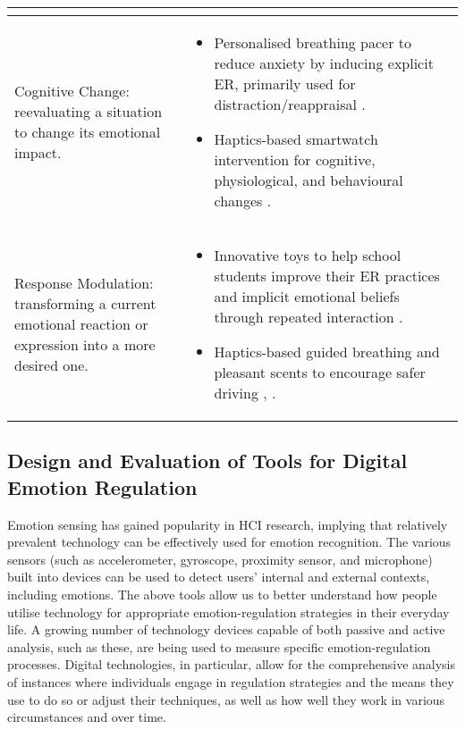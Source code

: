 \begin{table}[]
\begin{tabular}{m{6cm}m{10cm}}
\begin{itemize}
\end{itemize}                                       \\ \hline
Cognitive Change: reevaluating a situation to change its emotional impact.                                                               & \begin{itemize}
\item Personalised breathing pacer to reduce anxiety by inducing explicit ER, primarily used for distraction/reappraisal \cite{miri2020evaluating}.
\item Haptics-based smartwatch intervention for cognitive, physiological, and behavioural changes \cite{costa2019boostmeup}.
\end{itemize}                        \\ \hline
Response Modulation: transforming a current emotional reaction or expression into a more desired one.                                    & \begin{itemize}
\item Innovative toys to help school students improve their ER practices and implicit emotional beliefs through repeated interaction \cite{theofanopoulou2019smart}.
\item Haptics-based guided breathing and pleasant scents to encourage safer driving \cite{paredes2018just}, \cite{dmitrenko2020caroma}.
\end{itemize}                      \\ \hline
\end{tabular}
\end{table}
\raggedbottom

\subsection{Design and Evaluation of Tools for Digital Emotion Regulation}
Emotion sensing has gained popularity in HCI research, implying that relatively prevalent technology can be effectively used for emotion recognition. The various sensors (such as accelerometer, gyroscope, proximity sensor, and microphone) built into devices can be used to detect users' internal and external contexts, including emotions. The above tools allow us to better understand how people utilise technology for appropriate emotion-regulation strategies in their everyday life. A growing number of technology devices capable of both passive and active analysis, such as these, are being used to measure specific emotion-regulation processes. Digital technologies, in particular, allow for the comprehensive analysis of instances where individuals engage in regulation strategies and the means they use to do so or adjust their techniques, as well as how well they work in various circumstances and over time.

